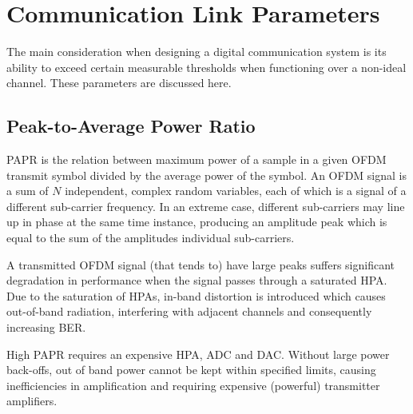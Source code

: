 
\section{Communication Link Parameters}
The main consideration when designing a digital communication system is its ability to exceed certain measurable thresholds when functioning over a non-ideal channel\cite{hayk}. These parameters are discussed here.

\subsection{Peak-to-Average Power Ratio}
\gls{PAPR} is the relation between maximum power of a sample in a given \gls{OFDM} transmit symbol divided by the average power of the symbol\cite{french}. An OFDM signal is a sum of \(N\) independent, complex random variables, each of which is a signal of a different sub-carrier frequency. In an extreme case, different sub-carriers may line up in phase at the same time instance, producing an amplitude peak which is equal to the sum of the amplitudes individual sub-carriers.

A transmitted OFDM signal (that tends to) have large peaks suffers significant degradation in performance when the signal passes through a saturated \gls{HPA}. Due to the saturation of \gls{HPA}s, in-band distortion is introduced which causes out-of-band radiation, interfering with adjacent channels\cite{prob} and consequently increasing \gls{BER}.

High \gls{PAPR} requires an expensive \gls{HPA}, \gls{ADC} and \gls{DAC}. Without large power back-offs, out of band power cannot be kept within specified limits, causing inefficiencies in amplification and requiring expensive (powerful) transmitter amplifiers.

